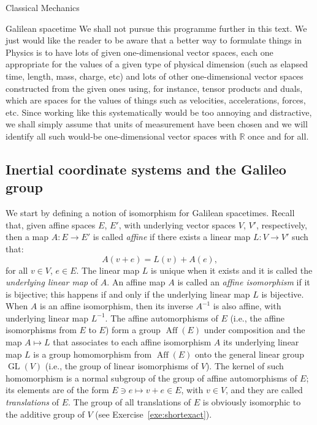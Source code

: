 \documentclass[oneside,a4paper,11pt]{amsbook}
\newcommand{\R}{\mathds R}
\DeclareMathOperator{\Aff}{Aff}
\DeclareMathOperator{\GL}{GL}
\theoremstyle{remark}\newtheorem{exercise}{Exercise}[chapter]
\theoremstyle{plain}\newtheorem{teo}{Theorem}[section]
\theoremstyle{plain}\newtheorem{lem}[teo]{Lemma}
\theoremstyle{plain}\newtheorem{prop}[teo]{Proposition}
\theoremstyle{plain}\newtheorem{cor}[teo]{Corollary}
\theoremstyle{definition}\newtheorem{defin}[teo]{Definition}
\theoremstyle{remark}\newtheorem{rem}[teo]{Remark}
\theoremstyle{definition}\newtheorem{notation}[teo]{Notation}
\theoremstyle{definition}\newtheorem{convention}[teo]{Convention}
\theoremstyle{definition}\newtheorem{example}[teo]{Example}
\numberwithin{section}{chapter}
\numberwithin{equation}{section}
\begin{document}
\begin{chapter}{Classical Mechanics}
\begin{section}{Galilean spacetime}
We shall not pursue this programme further in this text. We just would like the reader to be aware that a better way to
formulate things in Physics is to have lots of given one-dimensional vector spaces, each one appropriate for the values
of a given type of physical dimension (such as elapsed time, length, mass, charge, etc) and lots of other one-dimensional
vector spaces constructed from the given ones using, for instance, tensor products and duals, which are spaces for the
values of things such as velocities, accelerations, forces, etc. Since working like this systematically would be too
annoying and distractive, we shall simply assume that units of measurement have been chosen and we will identify all such
would-be one-dimensional vector spaces with $\R$ once and for all.

\subsection{Inertial coordinate systems and the Galileo group}
We start by defining a notion of isomorphism for Galilean spacetimes.
Recall that, given affine spaces $E$, $E'$, with underlying vector spaces $V$, $V'$, respectively, then a map
$A:E\to E'$ is called {\em affine\/} if there exists a linear map $L:V\to V'$ such that:
\[A(v+e)=L(v)+A(e),\]
for all $v\in V$, $e\in E$. The linear map $L$ is unique when it exists and it is called the {\em underlying linear map\/}
of $A$. An affine map $A$ is called an {\em affine isomorphism\/} if it is bijective; this happens if and only if
the underlying linear map $L$ is bijective. When $A$ is an affine isomorphism, then its inverse $A^{-1}$ is also
affine, with underlying linear map $L^{-1}$. The affine automorphisms of $E$ (i.e., the affine isomorphisms from $E$ to $E$)
form a group $\Aff(E)$ under composition and the map $A\mapsto L$ that associates to each affine isomorphism $A$ its underlying
linear map $L$ is a group homomorphism from $\Aff(E)$ onto the general linear group $\GL(V)$ (i.e., the group
of linear isomorphisms of $V$). The kernel of such homomorphism is a normal subgroup of the group of affine
automorphisms of $E$; its elements are of the form $E\ni e\mapsto v+e\in E$,
with $v\in V$, and they are called {\em translations\/} of $E$. The group of all translations of $E$ is obviously isomorphic
to the additive group of $V$ (see Exercise~\ref{exe:shortexact}).


\end{section}
\end{chapter}
\end{document}
